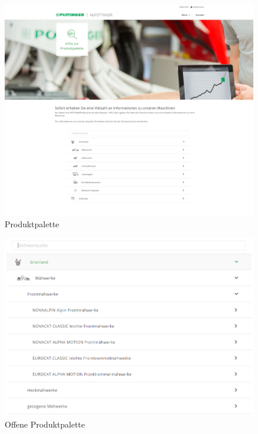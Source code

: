 \begin{figure}[H]
	\centerline{
		\includegraphics[width=1\textwidth]{./grafiken/erm_produktpalette.png}
	}
	\vskip0pt
	\caption{Produktpalette} \label{fig:produktpalette}
\end{figure}

\begin{figure}[H]
	\centerline{
		\includegraphics[width=1\textwidth]{./grafiken/erm_produktpalette_offen.png}
	}
	\vskip0pt
	\caption{Offene Produktpalette} \label{fig:produktpaletteOffen}
\end{figure}

